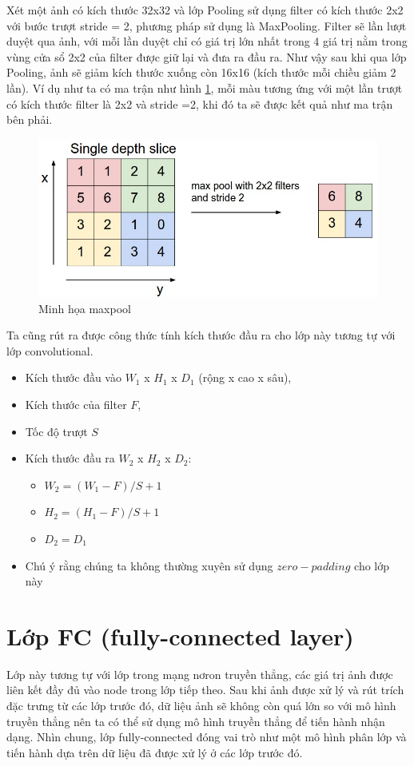 Xét một ảnh có kích thước 32x32 và lớp Pooling sử dụng filter có kích thước 2x2 với bước trượt stride = 2, phương pháp sử dụng là MaxPooling. Filter sẽ lần lượt duyệt qua ảnh, với mỗi lần duyệt chỉ có giá trị lớn nhất trong 4 giá trị nằm trong vùng cửa sổ 2x2 của filter được giữ lại và đưa ra đầu ra. Như vậy sau khi qua lớp Pooling, ảnh sẽ giảm kích thước xuống còn 16x16 (kích thước mỗi chiều giảm 2 lần). Ví dụ như ta có ma trận như hình \ref{fig:poolExample}, mỗi màu tương ứng với một lần trượt có kích thước filter là 2x2 và stride =2, khi đó ta sẽ được kết quả như ma trận bên phải.
\begin{center}
\begin{figure}[htp]
	\begin{center}
		\includegraphics[scale=0.5]{chap4/image/maxpoolEx.jpeg}
	\end{center}
	\caption{Minh họa maxpool}
	\label{fig:poolExample}
\end{figure}
\end{center}
Ta cũng rút ra được công thức tính kích thước đầu ra cho lớp này tương tự với lớp convolutional.
\begin{itemize}
	\item Kích thước đầu vào \textbf{$W_1$} x \textbf{$H_1$} x \textbf{$D_1$} (rộng x cao x sâu),
	\item Kích thước của filter \textbf{$F$},	
	\item Tốc độ trượt \textbf{$S$}
	\item Kích thước đầu ra \textbf{$W_2$} x \textbf{$H_2$} x \textbf{$D_2$}:
	\begin{itemize}
		\item  \textbf{$W_2 = (W_1 - F)/S +1$}
		\item  \textbf{$H_2 = (H_1 - F)/S +1$}
		\item \textbf{$D_2 = D_1$}
	\end{itemize}	 
	\item Chú ý rằng chúng ta không thường xuyên sử dụng $zero-padding$ cho lớp này
\end{itemize}
\section{Lớp FC (fully-connected layer)}
Lớp này tương tự với lớp trong mạng nơron truyền thẳng, các giá trị ảnh được liên kết đầy đủ vào node trong lớp tiếp theo. Sau khi ảnh được xử lý và rút trích đặc trưng từ các lớp trước đó, dữ liệu ảnh sẽ không còn quá lớn so với mô hình truyền thẳng nên ta có thể sử dụng mô hình truyền thẳng để tiến hành nhận dạng. Nhìn chung, lớp fully-connected đóng vai trò như một mô hình phân lớp và tiến hành dựa trên dữ liệu đã được xử lý ở các lớp trước đó.